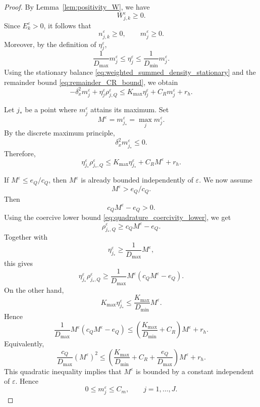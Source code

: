 \documentclass[11pt, dina4, amsfont12]{article}
\begin{document}
\begin{proof}
By Lemma~\ref{lem:positivity_W}, we have
\[
    W_{j,k}^\varepsilon\ge0.
\]
Since \(E_k^\varepsilon>0\), it follows that
\[
    n_{j,k}^\varepsilon\ge0,
    \qquad
    m_j^\varepsilon\ge0.
\]
Moreover, by the definition of \(\eta_j^\varepsilon\),
\[
    \frac1{D_{\max}}m_j^\varepsilon
    \le
    \eta_j^\varepsilon
    \le
    \frac1{D_{\min}}m_j^\varepsilon .
\]
Using the stationary balance \eqref{eq:weighted_summed_density_stationary}
and the remainder bound \eqref{eq:remainder_CR_bound}, we obtain
\[
    -\delta_x^2m_j^\varepsilon
    +
    \eta_j^\varepsilon\rho_{j,Q}^\varepsilon
    \le
    K_{\max}\eta_j^\varepsilon
    +
    C_Rm_j^\varepsilon
    +
    r_h .
\]

Let \(j_*\) be a point where \(m_j^\varepsilon\) attains its maximum. Set
\[
    M^\varepsilon=m_{j_*}^\varepsilon=\max_jm_j^\varepsilon .
\]
By the discrete maximum principle,
\[
    \delta_x^2m_{j_*}^\varepsilon\le0.
\]
Therefore,
\[
    \eta_{j_*}^\varepsilon\rho_{j_*,Q}^\varepsilon
    \le
    K_{\max}\eta_{j_*}^\varepsilon
    +
    C_RM^\varepsilon
    +
    r_h .
\]

If \(M^\varepsilon\le e_Q/c_Q\), then \(M^\varepsilon\) is already bounded
independently of \(\varepsilon\). We now assume
\[
    M^\varepsilon>e_Q/c_Q.
\]
Then
\[
    c_QM^\varepsilon-e_Q>0.
\]
Using the coercive lower bound \eqref{eq:quadrature_coercivity_lower}, we get
\[
    \rho_{j_*,Q}^\varepsilon
    \ge
    c_QM^\varepsilon-e_Q.
\]
Together with
\[
    \eta_{j_*}^\varepsilon
    \ge
    \frac1{D_{\max}}M^\varepsilon,
\]
this gives
\[
    \eta_{j_*}^\varepsilon\rho_{j_*,Q}^\varepsilon
    \ge
    \frac1{D_{\max}}
    M^\varepsilon
    \left(
        c_QM^\varepsilon-e_Q
    \right).
\]
On the other hand,
\[
    K_{\max}\eta_{j_*}^\varepsilon
    \le
    \frac{K_{\max}}{D_{\min}}M^\varepsilon .
\]
Hence
\[
    \frac1{D_{\max}}
    M^\varepsilon
    \left(
        c_QM^\varepsilon-e_Q
    \right)
    \le
    \left(
        \frac{K_{\max}}{D_{\min}}
        +
        C_R
    \right)
    M^\varepsilon
    +
    r_h .
\]
Equivalently,
\[
    \frac{c_Q}{D_{\max}}
    (M^\varepsilon)^2
    \le
    \left(
        \frac{K_{\max}}{D_{\min}}
        +
        C_R
        +
        \frac{e_Q}{D_{\max}}
    \right)
    M^\varepsilon
    +
    r_h .
\]
This quadratic inequality implies that \(M^\varepsilon\) is bounded by a
constant independent of \(\varepsilon\). Hence
\[
    0\le m_j^\varepsilon\le C_m,
    \qquad j=1,\ldots,J.
\]
\end{proof}
\end{document}
